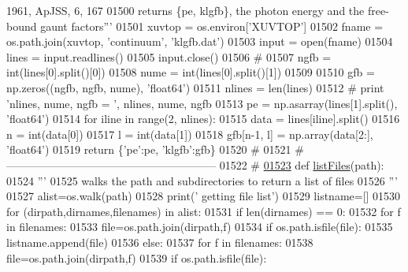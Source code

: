 \begin{DoxyCode}
{{{{{{{{{{{{{{{       1961, ApJSS, 6, 167}
01500 \textcolor{stringliteral}{    returns \{pe, klgfb\}, the photon energy and the free-bound gaunt factors'''}
01501     xuvtop = os.environ[\textcolor{stringliteral}{'XUVTOP'}]
01502     fname = os.path.join(xuvtop, \textcolor{stringliteral}{'continuum'}, \textcolor{stringliteral}{'klgfb.dat'})
01503     input = open(fname)
01504     lines = input.readlines()
01505     input.close()
01506     \textcolor{comment}{#}
01507     ngfb = int(lines[0].split()[0])
01508     nume = int(lines[0].split()[1])
01509 
01510     gfb = np.zeros((ngfb, ngfb, nume), \textcolor{stringliteral}{'float64'})
01511     nlines = len(lines)
01512 \textcolor{comment}{#        print 'nlines, nume, ngfb = ', nlines,  nume, ngfb}
01513     pe = np.asarray(lines[1].split(), \textcolor{stringliteral}{'float64'})
01514     \textcolor{keywordflow}{for} iline \textcolor{keywordflow}{in} range(2, nlines):
01515         data = lines[iline].split()
01516         n = int(data[0])
01517         l = int(data[1])
01518         gfb[n-1, l] = np.array(data[2:], \textcolor{stringliteral}{'float64'})
01519     \textcolor{keywordflow}{return} \{\textcolor{stringliteral}{'pe'}:pe, \textcolor{stringliteral}{'klgfb'}:gfb\}
01520 \textcolor{comment}{#}
01521 \textcolor{comment}{#  ---------------------------------------------------------}
01522 \textcolor{comment}{#}
\hypertarget{__chianti__tools_8py_source_l01523}{}\hyperlink{namespacepyneb_1_1utils_1_1__chianti__tools_a680536bf77d8f8baa8434c1bf84350a4}{01523} \textcolor{keyword}{def }\hyperlink{namespacepyneb_1_1utils_1_1__chianti__tools_a680536bf77d8f8baa8434c1bf84350a4}{listFiles}(path):
01524     \textcolor{stringliteral}{'''}
01525 \textcolor{stringliteral}{    walks the path and subdirectories to return a list of files}
01526 \textcolor{stringliteral}{    '''}
01527     alist=os.walk(path)
01528     print(\textcolor{stringliteral}{' getting file list'})
01529     listname=[]
01530     \textcolor{keywordflow}{for} (dirpath,dirnames,filenames) \textcolor{keywordflow}{in} alist:
01531         \textcolor{keywordflow}{if} len(dirnames) == 0:
01532             \textcolor{keywordflow}{for} f \textcolor{keywordflow}{in} filenames:
01533                 file=os.path.join(dirpath,f)
01534                 \textcolor{keywordflow}{if} os.path.isfile(file):
01535                     listname.append(file)
01536         \textcolor{keywordflow}{else}:
01537             \textcolor{keywordflow}{for} f \textcolor{keywordflow}{in} filenames:
01538                 file=os.path.join(dirpath,f)
01539                 \textcolor{keywordflow}{if} os.path.isfile(file):
}}}}}}}}}}}}}}
\end{DoxyCode}
